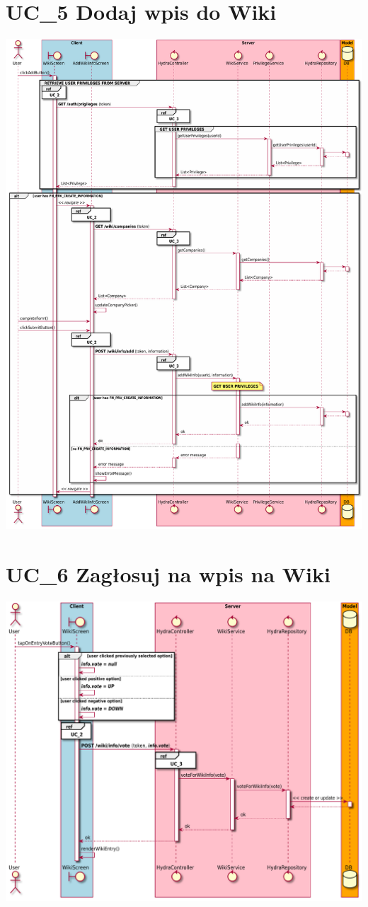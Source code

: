 \documentclass{scrreprt}
\begin{document}
\section{UC\_5 Dodaj wpis do Wiki}
\includegraphics[width=\textwidth, keepaspectratio]{graphics/sequence_diagram_wiki_add.pdf}

\section{UC\_6 Zagłosuj na wpis na Wiki}
\includegraphics[width=\textwidth, keepaspectratio]{graphics/sequence_diagram_wiki_vote.pdf}
\end{document}

